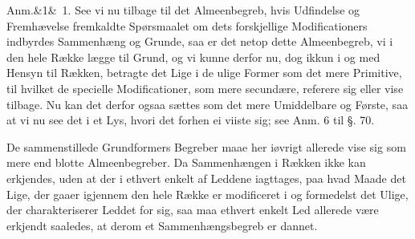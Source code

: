 \documentclass[12pt]{book}
\def\sperr#1{#1}%
\def\textit#1{#1}%
\def\emph#1{#1}%
\newcommand{\sperr}[1]{\textls[180]{#1}}
\newcommand{\anm}[1]{%
  \par\vspace{0.5\baselineskip}%
  \noindent\hspace{\parindent}\sperr{Anm.}\ifx&#1&\else~\textit{#1}.\fi
  \enspace\ignorespaces
}
\newcommand{\opage}[1]{\marginnote{\footnotesize\textit{[#1]}}}
\begin{document}
\anm{1} See vi nu tilbage til det Almeenbegreb, hvis Udfindelse og Fremhævelse
fremkaldte Spørsmaalet om dets forskjellige Modificationers indbyrdes Sammenhæng
og Grunde, saa er det netop dette Almeenbegreb, vi i den hele Række lægge til
Grund, og vi kunne derfor \emph{nu}, dog ikkun i og med Hensyn til Rækken,
betragte det Lige i de ulige Former som det
\opage{205} mere Primitive, til hvilket de specielle Modificationer, som mere secundære,
referere sig eller vise tilbage. Nu kan det derfor ogsaa sættes som det mere
Umiddelbare og Første, saa at vi nu see det i et Lys, hvori det forhen ei viiste
sig; see Anm. 6 til §. 70.

De sammenstillede Grundformers Begreber maae her iøvrigt allerede vise sig som
mere end blotte Almeenbegreber. Da Sammenhængen i Rækken ikke kan erkjendes, uden
at der i ethvert enkelt af Leddene iagttages, paa hvad \emph{Maade} det Lige, der
gaaer igjennem den hele Række er modificeret i og formedelst det Ulige, der
charakteriserer Leddet for sig, saa maa ethvert enkelt Led allerede være erkjendt
saaledes, at derom et Sammenhængsbegreb er dannet.
\end{document}
